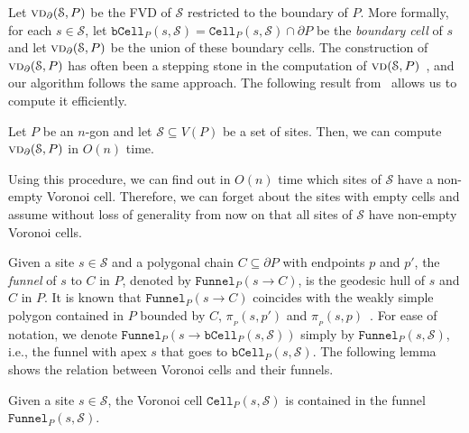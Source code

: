 \documentclass[a4paper,UKenglish]{socg-lipics-v2018}
\newcommand{\s}{\mathcal S}
\newcommand{\p}[3][P]{\ensuremath{\pi_{_{#1}}(#2, #3)}}
\newcommand{\funnel}[2][P]{\ensuremath{\mathtt{Funnel}_{\scriptscriptstyle #1}(#2)}}
\newcommand{\cell}[2][P]{\ensuremath{\mathtt{Cell}_{\scriptscriptstyle #1}(#2)}}
\newcommand{\bcell}[2][P]{\ensuremath{\mathtt{bCell}_{\scriptscriptstyle #1}(#2)}}
\newcommand{\vd}[2][P]{\textsc{vd}(#2, #1)}
\newcommand{\bvd}[2][P]{\textsc{vd}_{\partial}(#2, #1)}
\begin{document}
Let $\bvd{\s}$ be the FVD of $\s$ restricted to the boundary of $P$. 
More formally, for each $s\in \s$, let $\bcell{s, \s} = \cell{s, \s}\cap \partial P$ be the \emph{boundary cell} of $s$ and let $\bvd{\s}$ be the union of these boundary cells. The construction of $\bvd{\s}$ has often been a stepping stone in the computation of $\vd{\s}$~\cite{aronov1993furthest,oh2016farthest}, and our algorithm follows the same approach. 
The following result from~\cite{oh2016farthest} allows us to compute it efficiently.

\begin{theorem}\label{thm:VD in boundary}
Let $P$ be an $n$-gon and let $\s\subseteq V(P)$ be a set of sites. 
Then, we can compute $\bvd{\s}$ in $O(n)$ time. 
\end{theorem}

Using this procedure, we can find out in $O(n)$ time which sites of $\s$ have a non-empty Voronoi cell. 
Therefore, we can forget about the sites with empty cells and assume without loss of generality from now on that all sites of $\s$ have non-empty Voronoi cells.

Given a site $s\in \s$ and a polygonal chain $C \subseteq \partial P$ with endpoints $p$ and $p'$, the \emph{funnel} of $s$ to $C$ in $P$, denoted by $\funnel{s\to C}$, 
is the geodesic hull of $s$ and $C$ in $P$. 
It is known that $\funnel{s\to C}$ coincides with the weakly simple polygon contained in $P$ bounded by $C$, $\p{s}{p'}$ and $\p{s}{p}$~\cite{ahn2015linear}.
For ease of notation, we denote $\funnel{s \to \bcell{s, \s}}$ simply by $\funnel{s, \s}$, i.e., the funnel with apex $s$ that goes to $\bcell{s, \s}$.
The following lemma shows the relation between Voronoi cells and their funnels.


\begin{lemma}\label{lemma:Voronoi cell in funnel}
Given a site $s\in \s$, the Voronoi cell $\cell{s, \s}$ is contained in the funnel $\funnel{s, \s}$.
\end{lemma}
\end{document}
